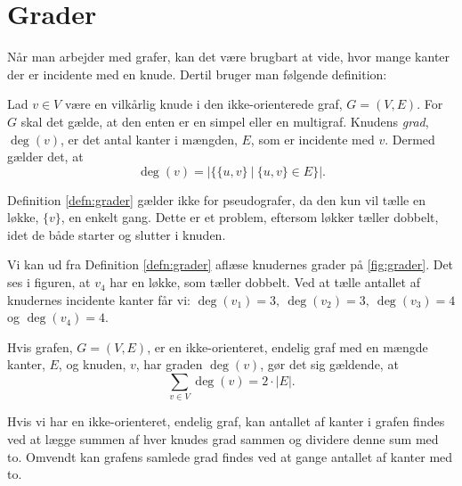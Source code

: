 \section{Grader} \label{sec:grader}
Når man arbejder med grafer, kan det være brugbart at vide, hvor mange kanter der er incidente med en knude. Dertil bruger man følgende definition:

\begin{defn}[Grader] \label{defn:grader}
Lad $v \in V$ være en vilkårlig knude i den ikke-orienterede graf, $G = (V,E)$. For $G$ skal det gælde, at den enten er en simpel eller en multigraf. Knudens \emph{grad}, $\deg(v)$, er det antal kanter i mængden, $E$, som er incidente med $v$. Dermed gælder det, at
\begin{equation}
\deg(v)=|\{ \{u,v\} \ | \ \{u,v\}\in E \}|.
\end{equation}
\end{defn}

Definition \ref{defn:grader} gælder ikke for pseudografer, da den kun vil tælle en løkke, $\{v\}$, en enkelt gang. Dette er et problem, eftersom løkker tæller dobbelt, idet de både starter og slutter i knuden.

\begin{exmp} \label{ex:grader}

Vi kan ud fra Definition \ref{defn:grader} aflæse knudernes grader på \autoref{fig:grader}. Det ses i figuren, at $v_4$ har en løkke, som tæller dobbelt. Ved at tælle antallet af knudernes incidente kanter får vi: $\deg(v_{1})=3, \ \deg(v_{2})=3, \ \deg(v_{3})=4$ og $\deg(v_{4})=4$.


\end{exmp}

\begin{thm}
Hvis grafen, $G = (V,E)$, er en ikke-orienteret, endelig graf med en mængde kanter, $E$, og knuden, $v$, har graden $\deg(v)$, gør det sig gældende, at
\begin{equation} \label{eq:degv=2e}
	\sum_{v \in V} { } \deg(v) = 2 \cdot |E|.
\end{equation}
\end{thm}

Hvis vi har en ikke-orienteret, endelig graf, kan antallet af kanter i grafen findes ved at lægge summen af hver knudes grad sammen og dividere denne sum med to. Omvendt kan grafens samlede grad findes ved at gange antallet af kanter med to.

